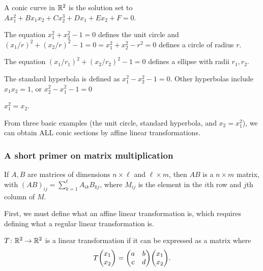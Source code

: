 \begin{definition}
    A conic curve in $\mathbb R^2$ is the solution set to $Ax_1^2 + Bx_1x_2 + Cx_2^3 + Dx_1 + Ex_2 + F = 0$.
\end{definition}

\begin{example}[Circle]
    The equation $x_1^2 + x_2^2 - 1 = 0$ defines the unit circle and $(x_1/r)^2 + (x_2/r)^2 - 1 = 0 = x_1^2 + x_2^2 - r^2 = 0$ defines a circle of radius $r$.
\end{example}

\begin{example}[Ellipse]
    The equation $(x_1/r_1)^2 + (x_2/r_2)^2 - 1 = 0$ defines a ellipse with radii $r_1, r_2$.  
\end{example}

\begin{example}[Hyperbola]
    The standard hyperbola is defined as $x_1^2 - x_2^2 - 1 = 0$. Other hyperbolas include $x_1x_2 = 1$, or $x_2^2 - x_1^2 - 1 = 0$
\end{example}

\begin{example}[Parabola]
    $x_1^2 = x_2$.
\end{example}

\begin{theorem}
    From three basic examples (the unit circle, standard hyperbola, and $x_2 = x_1^2$), we can obtain ALL conic sections by affine linear transformations.
\end{theorem}

\subsubsection*{A short primer on matrix multiplication}

If $A, B$ are matrices of dimensions $n \times \ell$ and $\ell \times m$, then $AB$ is a $n \times m$ matrix, with $(AB)_{ij} = \sum_{k = 1}^\ell A_{ik}B_{kj}$, where $M_{ij}$ is the element in the $i$th row and $j$th column of $M$.

First, we must define what an affine linear transformation is, which requires defining what a regular linear transformation is.

\begin{definition}
    $T \colon \mathbb R^2 \to \mathbb R^2$ is a linear transformation if it can be expressed as a matrix where \[T\mqty(x_1 \\ x_2) = \mqty(a & b \\ c & d)\mqty(x_1 \\ x_2).\]
\end{definition}

